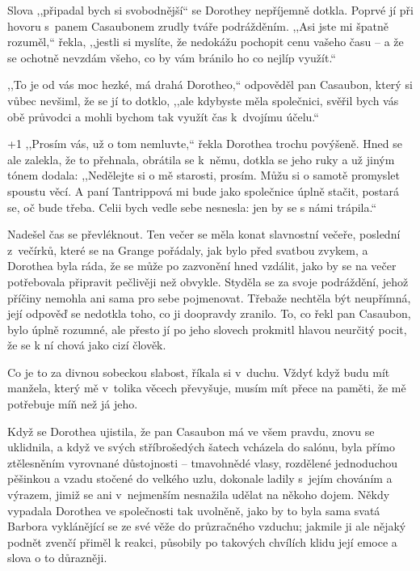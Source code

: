 Slova ,,připadal bych si svobodnější`` se Dorothey nepříjemně dotkla. Poprvé jí při hovoru s panem Casaubonem zrudly tváře podrážděním.
,,Asi jste mi špatně rozuměl,`` řekla, ,,jestli si myslíte, že nedokážu pochopit cenu vašeho času -- a že se ochotně nevzdám všeho, co by vám bránilo ho co nejlíp využít.``

,,To je od vás moc hezké, má drahá Dorotheo,`` odpověděl pan Casaubon, který si vůbec nevšiml, že se jí to dotklo, ,,ale kdybyste měla společnici, svěřil bych vás obě průvodci a mohli bychom tak využít čas k dvojímu účelu.``

\looseness+1
,,Prosím vás, už o tom nemluvte,`` řekla Dorothea trochu povýšeně. Hned se ale zalekla, že to přehnala, obrátila se k němu, dotkla se jeho ruky a už jiným tónem dodala: ,,Nedělejte si o mě starosti, prosím. Můžu si o samotě promyslet spoustu věcí. A paní Tantrippová mi bude jako společnice úplně stačit, postará se, oč bude třeba. Celii bych vedle sebe nesnesla: jen by se s námi trápila.``

Nadešel čas se převléknout. Ten večer se měla konat slavnostní večeře, poslední z večírků, které se na Grange pořádaly, jak bylo před svatbou zvykem, a Dorothea byla ráda, že se může po zazvonění hned vzdálit, jako by se na večer potřebovala připravit pečlivěji než obvykle. Styděla se za svoje podráždění, jehož příčiny nemohla ani sama pro sebe pojmenovat. Třebaže nechtěla být neupřímná, její odpověď se nedotkla toho, co ji doopravdy zranilo. To, co řekl pan Casaubon, bylo úplně rozumné, ale přesto jí po jeho slovech prokmitl hlavou neurčitý pocit, že se k ní chová jako cizí člověk.        

Co je to za divnou sobeckou slabost, říkala si v duchu. Vždyť když budu mít manžela, který mě v tolika věcech převyšuje, musím mít přece na paměti, že mě potřebuje míň než já jeho.

Když se Dorothea ujistila, že pan Casaubon má ve všem pravdu, znovu se uklidnila, a když ve svých stříbrošedých šatech vcházela do salónu, byla přímo ztělesněním vyrovnané důstojnosti -- tmavohnědé vlasy, rozdělené jednoduchou pěšinkou a vzadu stočené do velkého uzlu, dokonale ladily s jejím chováním a výrazem, jimiž se ani v nejmenším nesnažila udělat na někoho dojem. Někdy vypadala Dorothea ve společnosti tak uvolněně, jako by to byla sama svatá Barbora vyklánějící se ze své věže do průzračného vzduchu; jakmile ji ale nějaký podnět zvenčí přiměl k reakci, působily po takových chvílích klidu její emoce a slova o to důrazněji.      

